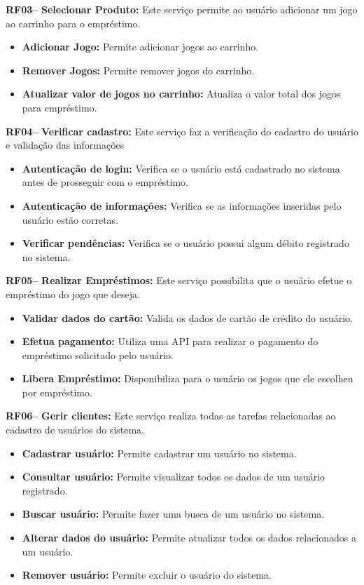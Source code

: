 \documentclass[a4paper, 12pt]{article}
\begin{document}
\textbf{RF03--} \textbf{Selecionar Produto:} Este serviço permite ao usuário adicionar um jogo ao carrinho para o empréstimo.

\begin{itemize}
    \item \textbf{Adicionar Jogo:} Permite adicionar jogos ao carrinho.
    \item \textbf{Remover Jogos:} Permite remover jogos do carrinho.
    \item \textbf{Atualizar valor de jogos no carrinho:} Atualiza o valor total dos jogos para empréstimo.
\end{itemize}

\textbf{RF04--} \textbf{Verificar cadastro:} Este serviço faz a verificação do cadastro do usuário e validação das informações
\begin{itemize}
    \item \textbf{Autenticação de login:} Verifica se o usuário está cadastrado no sistema antes de prosseguir com o empréstimo.
    \item \textbf{Autenticação de informações:} Verifica se as informações inseridas pelo usuário estão corretas.
    \item \textbf{Verificar pendências:} Verifica se o usuário possui algum débito registrado no sistema.
\end{itemize}

\textbf{RF05--} \textbf{Realizar Empréstimos:} Este serviço possibilita que o usuário efetue o empréstimo do jogo que deseja.
\begin{itemize}
    \item \textbf{Validar dados do cartão:} Valida os dados de cartão de crédito do usuário.
    \item \textbf{Efetua pagamento:} Utiliza uma API para realizar o pagamento do empréstimo solicitado pelo usuário.
    \item \textbf{Libera Empréstimo:} Disponibiliza para o usuário os jogos que ele escolheu por empréstimo.
\end{itemize}

\textbf{RF06--} \textbf{Gerir clientes:} Este serviço realiza todas as tarefas relacionadas ao cadastro de usuários do sistema.
\begin{itemize}
    \item \textbf{Cadastrar usuário:} Permite cadastrar um usuário no sistema.
    \item \textbf{Consultar usuário:} Permite visualizar todos os dados de um usuário registrado.
    \item \textbf{Buscar usuário:} Permite fazer uma busca de um usuário no sistema.
    \item \textbf{Alterar dados do usuário:} Permite atualizar todos os dados relacionados a um usuário.
    \item \textbf{Remover usuário:} Permite excluir o usuário do sistema.
\end{itemize}
\end{document}
